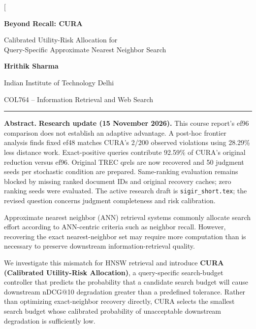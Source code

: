 \documentclass[10pt,twocolumn]{article}
\newcommand{\cura}{CURA}
\begin{document}
\twocolumn[
\begin{@twocolumnfalse}
\begin{center}
{\LARGE\bfseries Beyond Recall: CURA\par}
\vspace{0.12cm}
{\large Calibrated Utility-Risk Allocation for\\Query-Specific Approximate Nearest Neighbor Search\par}
\vspace{0.28cm}
{\normalsize\textbf{Hrithik Sharma}\par}
\vspace{0.05cm}
{\small Indian Institute of Technology Delhi\par}
{\small COL764 -- Information Retrieval and Web Search\par}
\vspace{0.22cm}
\end{center}
\noindent\rule{\textwidth}{0.65pt}
\vspace{0.10cm}
\begin{minipage}{0.97\textwidth}
\small
\textbf{Abstract.}
\textbf{Research update (15 November 2026).} This course report's ef96 comparison does not establish an adaptive advantage. A post-hoc frontier analysis finds fixed ef48 matches CURA's 2/200 observed violations using 28.29\% less distance work. Exact-positive queries contribute 92.59\% of CURA's original reduction versus ef96. Original TREC qrels are now recovered and 50 judgment seeds per stochastic condition are prepared. Same-ranking evaluation remains blocked by missing ranked document IDs and original recovery caches; zero ranking seeds were evaluated. The active research draft is \texttt{sigir\_short.tex}; the revised question concerns judgment completeness and risk calibration.

Approximate nearest neighbor (ANN) retrieval systems commonly allocate search effort according to ANN-centric criteria such as neighbor recall. However, recovering the exact nearest-neighbor set may require more computation than is necessary to preserve downstream information-retrieval quality.

We investigate this mismatch for HNSW retrieval and introduce \textbf{\cura{} (Calibrated Utility-Risk Allocation)}, a query-specific search-budget controller that predicts the probability that a candidate search budget will cause downstream nDCG@10 degradation greater than a predefined tolerance. Rather than optimizing exact-neighbor recovery directly, \cura{} selects the smallest search budget whose calibrated probability of unacceptable downstream degradation is sufficiently low.


\end{minipage}
\end{@twocolumnfalse}
\end{document}
